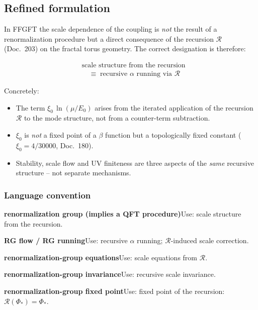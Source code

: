 \subsection*{Refined formulation}

In FFGFT the scale dependence of the coupling is \emph{not} the result of a
renormalization procedure but a direct consequence of the recursion
$\mathcal{R}$ (Doc.~203) on the fractal torus geometry. The correct designation
is therefore:

\begin{equation}
  \boxed{\;
  \begin{aligned}
    &\text{scale structure from the recursion} \\
    &\quad\equiv\; \text{recursive $\alpha$ running via $\mathcal{R}$}
  \end{aligned}
  \;}
  \tag{190.12}
\end{equation}

Concretely:
\begin{itemize}
  \item The term $\xi_0\,\ln(\mu/E_0)$ arises from the iterated application of
        the recursion $\mathcal{R}$ to the mode structure, not from a
        counter-term subtraction.
  \item $\xi_0$ is \emph{not} a fixed point of a $\beta$ function but a
        topologically fixed constant ($\xi_0 = 4/30000$, Doc.~180).
  \item Stability, scale flow and UV finiteness are three aspects of the
        \emph{same} recursive structure -- not separate mechanisms.
\end{itemize}

\subsubsection*{Language convention}

\smallskip\noindent \textbf{renormalization group (implies a QFT procedure)}\quad Use: scale structure from the recursion.

\smallskip\noindent \textbf{RG flow / RG running}\quad Use: recursive $\alpha$ running; $\mathcal{R}$-induced scale correction.

\smallskip\noindent \textbf{renormalization-group equations}\quad Use: scale equations from $\mathcal{R}$.

\smallskip\noindent \textbf{renormalization-group invariance}\quad Use: recursive scale invariance.

\smallskip\noindent \textbf{renormalization-group fixed point}\quad Use: fixed point of the recursion: $\mathcal{R}(\Phi_*) = \Phi_*$.

